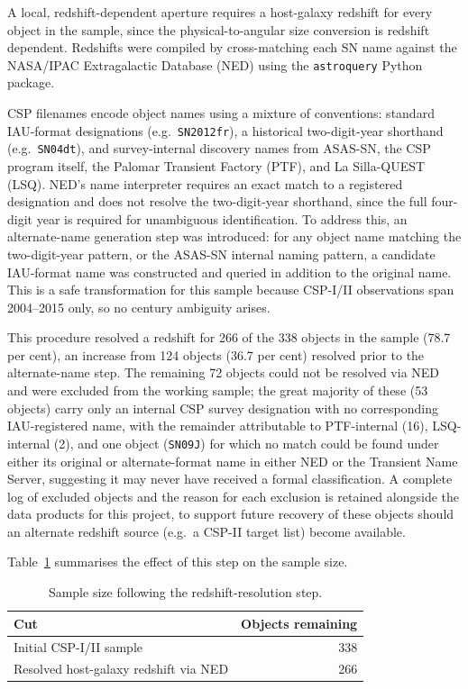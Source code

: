 \documentclass[12pt]{article}
\begin{document}
A local, redshift-dependent aperture requires a host-galaxy redshift for every object in the sample, since the physical-to-angular size conversion is redshift dependent. Redshifts were compiled by cross-matching each SN name against the NASA/IPAC Extragalactic Database (NED) using the \texttt{astroquery} Python package.

CSP filenames encode object names using a mixture of conventions: standard IAU-format designations (e.g.\ \texttt{SN2012fr}), a historical two-digit-year shorthand (e.g.\ \texttt{SN04dt}), and survey-internal discovery names from ASAS-SN, the CSP program itself, the Palomar Transient Factory (PTF), and La Silla-QUEST (LSQ). NED's name interpreter requires an exact match to a registered designation and does not resolve the two-digit-year shorthand, since the full four-digit year is required for unambiguous identification. To address this, an alternate-name generation step was introduced: for any object name matching the two-digit-year pattern, or the ASAS-SN internal naming pattern, a candidate IAU-format name was constructed and queried in addition to the original name. This is a safe transformation for this sample because CSP-I/II observations span 2004--2015 only, so no century ambiguity arises.

This procedure resolved a redshift for 266 of the 338 objects in the sample (78.7 per cent), an increase from 124 objects (36.7 per cent) resolved prior to the alternate-name step. The remaining 72 objects could not be resolved via NED and were excluded from the working sample; the great majority of these (53 objects) carry only an internal CSP survey designation with no corresponding IAU-registered name, with the remainder attributable to PTF-internal (16), LSQ-internal (2), and one object (\texttt{SN09J}) for which no match could be found under either its original or alternate-format name in either NED or the Transient Name Server, suggesting it may never have received a formal classification. A complete log of excluded objects and the reason for each exclusion is retained alongside the data products for this project, to support future recovery of these objects should an alternate redshift source (e.g.\ a CSP-II target list) become available.

Table~\ref{tab:sample_cuts} summarises the effect of this step on the sample size.

\begin{table}[h]
\centering
\caption{Sample size following the redshift-resolution step.}
\label{tab:sample_cuts}
\begin{tabular}{lr}
\toprule
Cut & Objects remaining \\
\midrule
Initial CSP-I/II sample & 338 \\
Resolved host-galaxy redshift via NED & 266 \\
\bottomrule
\end{tabular}
\end{table}
\end{document}
